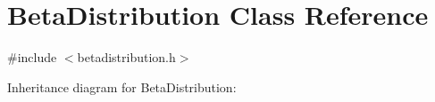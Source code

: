 \hypertarget{classBetaDistribution}{}\section{Beta\+Distribution Class Reference}
\label{classBetaDistribution}


{\ttfamily \#include $<$betadistribution.\+h$>$}



Inheritance diagram for Beta\+Distribution\+:
